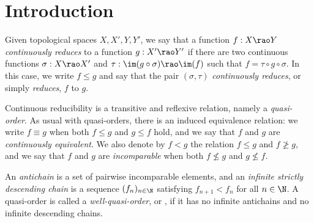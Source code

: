 
\chapter{Introduction}


\begin{definition}\label{MainDef}
Given topological spaces $X,X', Y, Y'$,
we say that a function $f:X\rao Y$ \emph{continuously reduces}
to a function $g:X'\rao Y'$ if there are two continuous functions $\sigma:X\rao X'$
and $\tau:\im(g\circ\sigma)\rao\im(f)$ such that $f=\tau\circ g\circ\sigma$. In this case, we write $f\leq g$ and say that the pair $(\sigma,\tau)$ \emph{continuously reduces}, or simply \emph{reduces}, $f$ to $g$.
\end{definition}

\begin{center}
\end{center}


Continuous reducibility is a transitive and reflexive relation, namely a \emph{quasi-order}.
As usual with quasi-orders, there is an induced equivalence relation: we write $f\equiv g$ when both $f\leq g$ and $g\leq f$ hold,
and we say that $f$ and $g$ are \emph{continuously equivalent}.
We also denote by $f<g$ the relation $f\leq g$ and $f\not\geq g$, and we say that $f$ and $g$ are \emph{incomparable} %
when both $f\not\leq g$ and $g\not\leq f$.

An \emph{antichain} is a set of pairwise incomparable elements, and an \emph{infinite strictly descending chain} is a sequence $(f_n)_{n\in\N}$
satisfying $f_{n+1}<f_n$ for all $n\in\N$. A quasi-order is called a \emph{well-quasi-order}, or \wqo{}, if it has no infinite antichains and no infinite descending chains.

